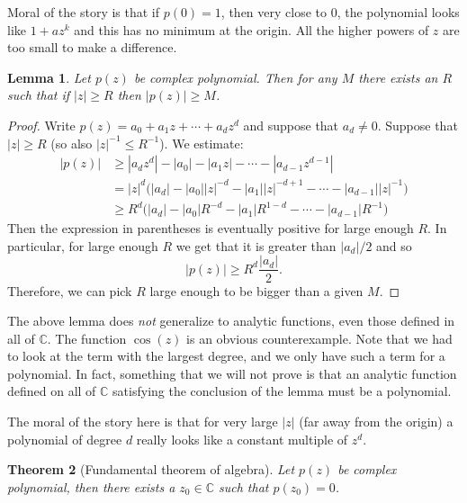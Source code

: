 \documentclass[12pt]{book}
\newcommand{\abs}[1]{\left\lvert {#1} \right\rvert}
\newcommand{\C}{{\mathbb{C}}}
\theoremstyle{plain}
\newtheorem{thm}{Theorem}[section]
\newtheorem{lemma}[thm]{Lemma}
\theoremstyle{remark}
\theoremstyle{definition}
\theoremstyle{exercise}
\theoremstyle{example}
\begin{document}
Moral of the story is that if $p(0) = 1$, then very close to 0, the
polynomial
looks like $1+az^k$ and this has no minimum at the origin.  All the higher
powers of $z$ are too small to make a difference.

\begin{lemma}
Let $p(z)$ be complex polynomial.  Then for any $M$ there exists
an $R$ such that if $\abs{z} \geq R$ then $\abs{p(z)} \geq M$.
\end{lemma}

\begin{proof}
Write $p(z) = a_0 + a_1 z + \cdots + a_d z^d$ and suppose that
$a_d \not= 0$.
Suppose that $\abs{z} \geq R$ (so also $\abs{z}^{-1} \leq R^{-1}$).
We estimate:
\begin{equation*}
\begin{split}
\abs{p(z)}
& \geq
\abs{a_d z^d} -
\abs{a_0} - \abs{a_1 z} - \cdots - \abs{a_{d-1} z^{d-1} }
\\
& =
\abs{z}^d \bigl(
\abs{a_d} -
\abs{a_0} \abs{z}^{-d} -
\abs{a_1} \abs{z}^{-d+1} - \cdots - \abs{a_{d-1}} \abs{z}^{-1}
\bigr)
\\
& \geq
R^d \bigl(\abs{a_d} -
\abs{a_0}R^{-d} - \abs{a_1}R^{1-d} - \cdots - \abs{a_{d-1}}R^{-1} \bigr)
\end{split}
\end{equation*}
Then the expression in parentheses is eventually positive for large enough
$R$.  In particular, for large enough $R$ we get that it is greater than
$\abs{a_d}/2$ and so
$$
\abs{p(z)}
\geq
R^d \frac{\abs{a_d}}{2} .
$$
Therefore,
we can pick $R$ large enough to be bigger than a given $M$.
\end{proof}

The above lemma does \emph{not} generalize to analytic
functions, even those defined in all of $\C$.  The function
$\cos(z)$ is an obvious counterexample.
Note that we had to look
at the term with the largest degree, and we only have such a term for
a polynomial.  In fact, something that we will not prove is that
an analytic function defined on all of $\C$ satisfying the conclusion
of the lemma
must be a polynomial.

The moral of the story here is that for very large $\abs{z}$ (far away from
the origin) a polynomial of degree $d$ really looks like a constant multiple
of $z^d$.

\begin{thm}[Fundamental theorem of algebra]
Let $p(z)$ be complex polynomial, then there exists a $z_0 \in \C$
such that $p(z_0) = 0$.
\end{thm}
\end{document}
